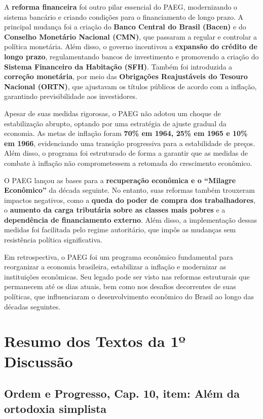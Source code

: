 \documentclass[a4paper,12pt]{article}[abntex2]
\begin{document}
A \textbf{reforma financeira} foi outro pilar essencial do PAEG, modernizando o sistema bancário e criando condições para o financiamento de longo prazo. A principal mudança foi a criação do \textbf{Banco Central do Brasil (Bacen)} e do \textbf{Conselho Monetário Nacional (CMN)}, que passaram a regular e controlar a política monetária. Além disso, o governo incentivou a \textbf{expansão do crédito de longo prazo}, regulamentando bancos de investimento e promovendo a criação do \textbf{Sistema Financeiro da Habitação (SFH)}. Também foi introduzida a \textbf{correção monetária}, por meio das \textbf{Obrigações Reajustáveis do Tesouro Nacional (ORTN)}, que ajustavam os títulos públicos de acordo com a inflação, garantindo previsibilidade aos investidores.

Apesar de suas medidas rigorosas, o PAEG não adotou um choque de estabilização abrupto, optando por uma estratégia de ajuste gradual da economia. As metas de inflação foram \textbf{70\% em 1964, 25\% em 1965 e 10\% em 1966}, evidenciando uma transição progressiva para a estabilidade de preços. Além disso, o programa foi estruturado de forma a garantir que as medidas de combate à inflação não comprometessem a retomada do crescimento econômico.

O PAEG lançou as bases para a \textbf{recuperação econômica e o ``Milagre Econômico''} da década seguinte. No entanto, suas reformas também trouxeram impactos negativos, como a \textbf{queda do poder de compra dos trabalhadores}, o \textbf{aumento da carga tributária sobre as classes mais pobres} e a \textbf{dependência de financiamento externo}. Além disso, a implementação dessas medidas foi facilitada pelo regime autoritário, que impôs as mudanças sem resistência política significativa.

Em retrospectiva, o PAEG foi um programa econômico fundamental para reorganizar a economia brasileira, estabilizar a inflação e modernizar as instituições econômicas. Seu legado pode ser visto nas reformas estruturais que permanecem até os dias atuais, bem como nos desafios decorrentes de suas políticas, que influenciaram o desenvolvimento econômico do Brasil ao longo das décadas seguintes.

\newpage
\section{\textbf{Resumo dos Textos da 1º Discussão}}
\subsection{\textbf{Ordem e Progresso, Cap. 10, item: Além da ortodoxia simplista}}
\end{document}
